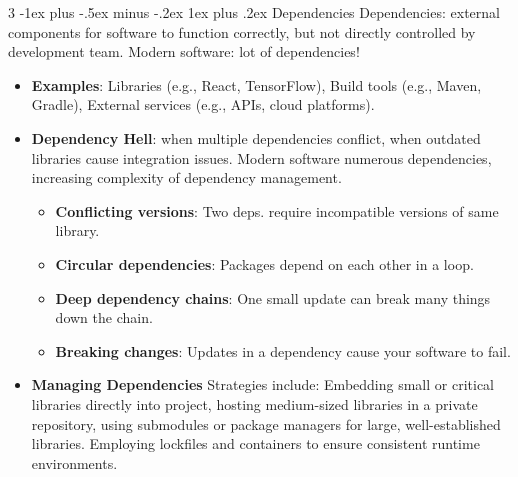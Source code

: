 \documentclass[a4paper, 10pt, landscape]{article}
\makeatletter
\renewcommand{\subsubsection}{\@startsection{subsubsection}{3}{0mm}%
                                {-1ex plus -.5ex minus -.2ex}%
                                {1ex plus .2ex}%
                                {\normalfont\small\bfseries}}
\makeatother
\begin{document}
\begin{multicols*}{3}
\subsubsection{Dependencies}
Dependencies: external components for software to function correctly, but not directly controlled by development team. Modern software: lot of dependencies!
\begin{itemize}
    \item \textbf{Examples}: Libraries (e.g., React, TensorFlow), Build tools (e.g., Maven, Gradle), External services (e.g., APIs, cloud platforms).
    \item \textbf{Dependency Hell}: when multiple dependencies conflict, when outdated libraries cause integration issues. Modern software numerous dependencies, increasing complexity of dependency management.
    \begin{itemize}
	\item \textbf{Conflicting versions}: Two deps. require incompatible versions of same library.
	\item \textbf{Circular dependencies}: Packages depend on each other in a loop.
	\item \textbf{Deep dependency chains}: One small update can break many things down the chain.
	\item \textbf{Breaking changes}: Updates in a dependency cause your software to fail.
	\end{itemize}
    \item \textbf{Managing Dependencies} Strategies include: Embedding small or critical libraries directly into project, hosting medium-sized libraries in a private repository, using submodules or package managers for large, well-established libraries. Employing lockfiles and containers to ensure consistent runtime environments.
\end{itemize}


\end{multicols*}
\end{document}
